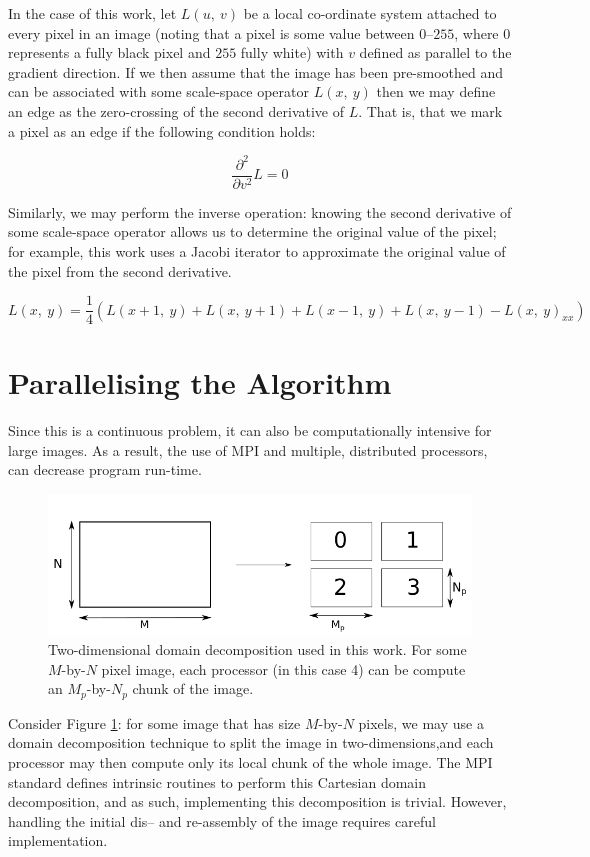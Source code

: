\documentclass{article} %
\begin{document}
In the case of this work, let $L\left(u,~v\right)$ be a local co-ordinate system attached to every pixel in an image (noting that a pixel is some value between $0$--$255$, where $0$ represents a fully black pixel and $255$ fully white) with $v$ defined as parallel to the gradient direction. If we then assume that the image has been pre-smoothed and can be associated with some scale-space operator $L\left(x,~y\right)$ then we may define an edge as the zero-crossing of the second derivative of $L$. That is, that we mark a pixel as an edge if the following condition holds:

$$
\frac{\partial^2}{\partial v^2}L = 0
$$

\noindent Similarly, we may perform the inverse operation: knowing the second derivative of some scale-space operator allows us to determine the original value of the pixel; for example, this work uses a Jacobi iterator to approximate the original value of the pixel from the second derivative.

$$
L(x,~y) = \frac{1}{4} \left( L(x+1,~y) + L(x,~y+1) + L(x-1,~y) + L(x,~y-1) - L(x,~y)_{xx}\right)
$$

\section*{Parallelising the Algorithm}

Since this is a continuous problem, it can also be computationally intensive for large images. As a result, the use of MPI and multiple, distributed processors, can decrease program run-time.

\begin{figure}
    \centering
    \includegraphics[width=\textwidth]{figures/domain_decomp.png}
    \caption{Two-dimensional domain decomposition used in this work. For some $M$-by-$N$ pixel image, each processor (in this case 4) can be compute an $M_p$-by-$N_p$ chunk of the image.}
    \label{f:domain}
\end{figure}

Consider Figure \ref{f:domain}: for some image that has size $M$-by-$N$ pixels, we may use a domain decomposition technique to split the image in two-dimensions,and each processor may then compute only its local chunk of the whole image.
The MPI standard defines intrinsic routines to perform this Cartesian domain decomposition, and as such, implementing this decomposition is trivial.
However, handling the initial dis-- and re-assembly of the image requires careful implementation.
\end{document}

